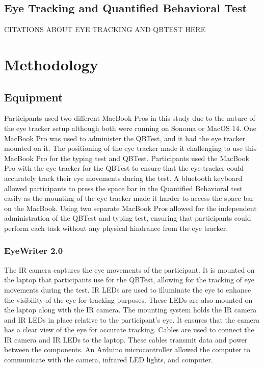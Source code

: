 \documentclass[manuscript, screen, review]{acmart} %
\begin{document}
\subsection{Eye Tracking and Quantified Behavioral Test}

CITATIONS ABOUT EYE TRACKING AND QBTEST HERE

\section{Methodology}
\subsection[short]{Equipment} 
Participants used two different MacBook Pros in this study due to the nature of the eye tracker setup although both were running on Sonoma or MacOS 14. One MacBook Pro was used to administer the QBTest, and it had the eye tracker mounted on it. The positioning of the eye tracker made it challenging to use this MacBook Pro for the typing test and QBTest. 
Participants used the MacBook Pro with the eye tracker for the QBTest to ensure that the eye tracker could accurately track their eye movements during the test. 
A bluetooth keyboard allowed participants to press the space bar in the Quantified Behavioral test easily as the mounting of the eye tracker made it harder to access
the space bar on the MacBook.
Using two separate MacBook Pros allowed for the independent administration of the QBTest and typing test, ensuring that participants could perform each task without any physical hindrance from the eye tracker.

\subsubsection{EyeWriter 2.0}
The IR camera captures the eye movements of the participant.
It is mounted on the laptop that participants use for the QBTest, allowing for the tracking of eye movements during the test.
IR LEDs are used to illuminate the eye to enhance the visibility of the eye for tracking purposes. 
These LEDs are also mounted on the laptop along with the IR camera. 
The mounting system holds the IR camera and IR LEDs in place relative to the participant's eye. 
It ensures that the camera has a clear view of the eye for accurate tracking. 
Cables are used to connect the IR camera and IR LEDs to the laptop. These cables transmit data and power between the components.
An Arduino microcontroller allowed the computer to communicate with the camera, infrared LED lights, and computer.
\end{document}
